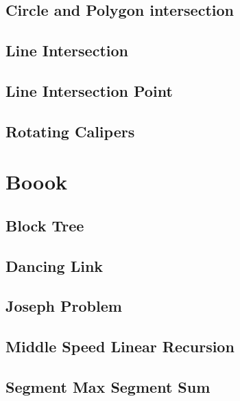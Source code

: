 \documentclass[a4paper,10pt,twocolumn,oneside]{article}
\begin{document}
\subsection{Circle and Polygon intersection}


\subsection{Line Intersection}


\subsection{Line Intersection Point}


\subsection{Rotating Calipers}



\section{Boook}

\subsection{Block Tree}


\subsection{Dancing Link}


\subsection{Joseph Problem}


\subsection{Middle Speed Linear Recursion}


\subsection{Segment Max Segment Sum}

\end{document}
